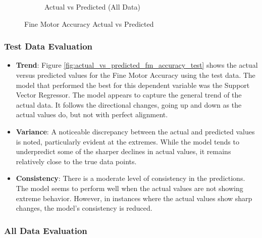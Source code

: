 \begin{figure}[htbp]
\begin{subfigure}[b]{0.49\textwidth}
        \caption{Actual vs Predicted (All Data)}
        \label{fig:actual_vs_predicted_fm_accuracy_all_data}
    \end{subfigure}
    \caption{Fine Motor Accuracy Actual vs Predicted}
    \label{fig:fine_motor_accuracy_comparison}
\end{figure}

\subsubsection*{Test Data Evaluation}

\begin{itemize}
    \item \textbf{Trend}: Figure \ref{fig:actual_vs_predicted_fm_accuracy_test} shows the actual versus predicted values for the Fine Motor Accuracy using the test data. The model
          that performed the best for this dependent variable was the Support Vector Regressor. The model appears to capture the general trend of the actual data. It follows the directional
          changes, going up and down as the actual values do, but not with perfect alignment.
    \item \textbf{Variance}: A noticeable discrepancy between the actual and predicted values is noted, particularly evident at the extremes. While the model tends to underpredict some of the sharper
          declines in actual values, it remains relatively close to the true data points.
    \item \textbf{Consistency}: There is a moderate level of consistency in the predictions. The model seems to perform well when the actual values are not showing extreme behavior. However,
          in instances where the actual values show sharp changes, the model's consistency is reduced.
\end{itemize}

\subsubsection*{All Data Evaluation}

